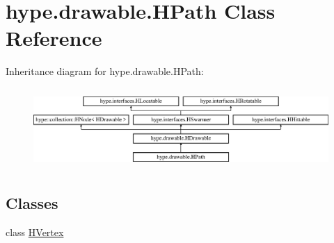 \hypertarget{classhype_1_1drawable_1_1_h_path}{\section{hype.\-drawable.\-H\-Path Class Reference}
\label{classhype_1_1drawable_1_1_h_path}
}
Inheritance diagram for hype.\-drawable.\-H\-Path\-:\begin{figure}[H]
\begin{center}
\leavevmode
\includegraphics[height=3.111111cm]{classhype_1_1drawable_1_1_h_path}
\end{center}
\end{figure}
\subsection*{Classes}
\begin{DoxyCompactItemize}
\item 
class \hyperlink{classhype_1_1drawable_1_1_h_path_1_1_h_vertex}{H\-Vertex}
\end{DoxyCompactItemize}
